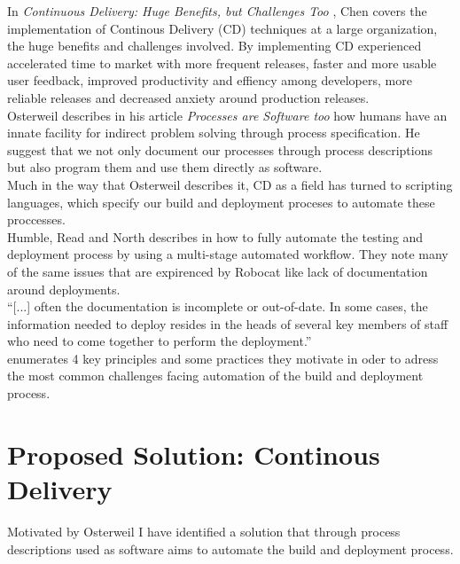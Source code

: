 \documentclass{ituthesis}
\begin{document}
In \textit{Continuous Delivery: Huge Benefits, but Challenges Too} \cite{Chen2015}, Chen covers the implementation of Continous Delivery (CD) techniques at a large organization, the huge benefits and challenges involved. By implementing CD \cite{Chen2015} experienced accelerated time to market with more frequent releases, faster and more usable user feedback, improved productivity and effiency among developers, more reliable releases and decreased anxiety around production releases.\\

Osterweil \cite{Osterweil1997} describes in his article \textit{Processes are Software too} how humans have an innate facility for indirect problem solving through process specification. He suggest that we not only document our processes through process descriptions but also program them and use them directly as software.\\

Much in the way that Osterweil describes it, CD as a field has turned to scripting languages, which specify our build and deployment proceses to automate these proccesses.\\

Humble, Read and North describes in \cite{Humble2006} how to fully automate the testing and deployment process by using a multi-stage automated workflow. They note many of the same issues that are expirenced by Robocat like lack of documentation around deployments.\\

``[...] often the documentation is incomplete or out-of-date. In some cases, the information needed to deploy resides in the heads of several key members of staff who need to come together to perform the deployment.'' \cite{Humble2006} \\

\cite{Humble2006} enumerates 4 key principles and some practices they motivate in oder to adress the most common challenges facing automation of the build and deployment process.\\

\chapter{Proposed Solution: Continous Delivery}

Motivated by Osterweil \cite{Osterweil1997} I have identified a solution that through process descriptions used as software aims to automate the build and deployment process.\\
\end{document}
